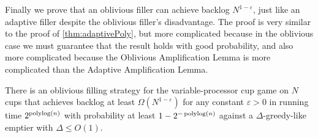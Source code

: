 Finally we prove that an oblivious filler can achieve backlog
$N^{1-\varepsilon}$, just like an adaptive filler despite the
oblivious filler's disadvantage. The proof is very similar to the
proof of \cref{thm:adaptivePoly}, but more complicated because in
the oblivious case we must guarantee that the result holds with
good probability, and also more complicated because the Oblivious
Amplification Lemma is more complicated than the Adaptive
Amplification Lemma. 
\begin{theorem}
  \label{thm:obliviousPoly}
  There is an oblivious filling strategy for the
  variable-processor cup game on $N$ cups that achieves backlog
  at least $\Omega(N^{1-\varepsilon})$ for any constant $\varepsilon
  >0$ in running time $2^{\operatorname{\text{polylog}}(n)}$ with probability at least
  $1-2^{-\operatorname{\text{polylog}}(n)}$ against a $\Delta$-greedy-like emptier
  with $\Delta \le O(1)$.
\end{theorem}
